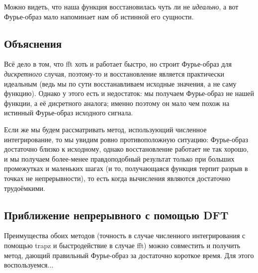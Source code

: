 \documentclass[a4paper,hidelinks,14pt]{extarticle}
\begin{document}
	Можно видеть, что наша функция восстановилась чуть ли не \textit{идеально}, а вот Фурье-образ мало напоминает нам об истинной его сущности.
	
	\subsection{Объяснения}
	Всё дело в том, что fft хоть и работает быстро, но строит Фурье-образ для \textit{дискретного} случая, поэтому-то и восстановление является практически идеальным (ведь мы по сути восстанавливаем исходные значения, а не саму функцию). Однако у этого есть и недостаток: мы получаем Фурье-образ не нашей функции, а её дисретного аналога; именно поэтому он мало чем похож на истинный Фурье-образ исходного сигнала.
	
	Если же мы будем рассматривать метод, использующий численное интегрирование, то мы увидим ровно противоположную ситуацию: Фурье-образ достаточно близко к исходному, однако восстановление работает не так хорошо, и мы получаем более-менее правдоподобный результат только при больших промежутках и маленьких шагах (и то, получающаяся функция терпит разрыв в точках не непрерывности), то есть когда вычисления являются достаточно трудоёмкими.
	
	\subsection{Приближение непрерывного с помощью DFT}
	
	Преимущества обоих методов (точность в случае численного интегрирования с помощью trapz и быстродействие в случае fft) можно совместить и получить метод, дающий правильный Фурье-образ за достаточно короткое время. Для этого воспользуемся...
	
	
	
\end{document}

